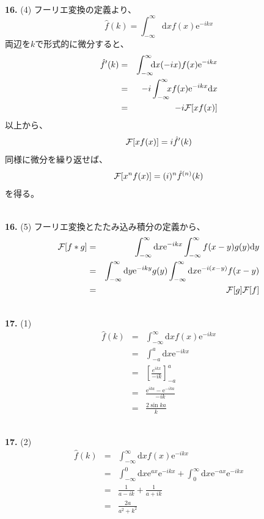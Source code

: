 \documentclass{jarticle}
\newcommand{\diff}{\mathrm d}
\newcommand{\ans}[2]{\noindent\\ {\bf \large #1.} (#2)}
\newcommand{\e}{\mathrm e}
\begin{document}
\ans{16}{4}
フーリエ変換の定義より、
\begin{equation}
  \hat{f}(k) = \int_{-\infty}^{\infty} \!\!\! \diff x f(x) \e^{-ikx}
\end{equation}
両辺を$k$で形式的に微分すると、
\begin{eqnarray}
  \hat{f}'(k) &=& \int_{-\infty}^{\infty} \!\!\! \diff x (-ix) f(x) \e^{-ikx}\\
  &=& -i \int_{-\infty}^{\infty} \!\!\! x f(x) \e^{-ikx} \diff x\\
  &=& -i {\cal F}[x f(x)]
\end{eqnarray}
以上から、
\begin{equation}
  {\cal F}[x f(x)] = i \hat{f}'(k)
\end{equation}
同様に微分を繰り返せば、
\begin{equation}
  {\cal F}[x^n f(x)] = (i)^n \hat{f}^{(n)}(k)
\end{equation}
を得る。

\ans{16}{5}
フーリエ変換とたたみ込み積分の定義から、
\begin{eqnarray}
  {\cal F}[f*g] &=& \int_{-\infty}^{\infty} \diff x \e^{-ikx} \int_{-\infty}^{\infty} f(x-y)g(y)\diff y \\
  &=& \int_{-\infty}^{\infty} \diff y \e^{-iky} g(y) \int_{-\infty}^{\infty} \diff x \e^{-i(x-y)} f(x-y)\\
  &=& {\cal F}[g] {\cal F}[f]
\end{eqnarray}


\ans{17}{1}
\begin{eqnarray}
  \hat{f}(k) &=& \int_{-\infty}^{\infty} \!\!\! \diff x f(x) \e^{-ikx} \\
  &=& \int_{-a}^{a} \!\!\! \diff x \e^{-ikx} \\
  &=&
  \left[
    \frac{e^{ikx}}{-ik}
    \right]_{-a}^{a}\\
  &=& \frac{\e^{ika}-\e^{-ika}}{-ik}\\
  &=& \frac{2\sin ka}{k}
\end{eqnarray}

\ans{17}{2}
\begin{eqnarray}
  \hat{f}(k) &=& \int_{-\infty}^{\infty} \!\!\! \diff x f(x) \e^{-ikx} \\
  &=&
  \int_{-\infty}^{0} \!\!\! \diff x \e^{ax} \e^{-ikx}+
  \int_{0}^{\infty} \!\!\! \diff x \e^{-ax} \e^{-ikx}\\
  &=& \frac{1}{a-ik} + \frac{1}{a+ik} \\
  &=& \frac{2a}{a^2+k^2}
\end{eqnarray}
\end{document}
